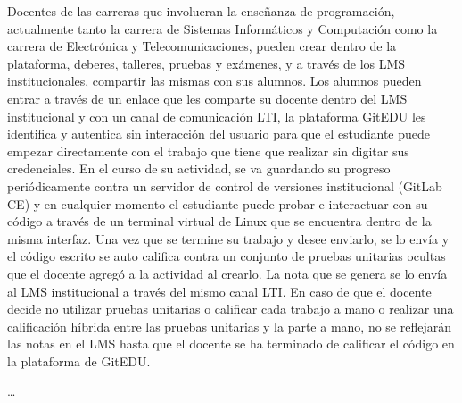 Docentes de las carreras que involucran la enseñanza de programación, actualmente tanto la carrera de Sistemas Informáticos y Computación como la carrera de Electrónica y Telecomunicaciones, pueden crear dentro de la plataforma, deberes, talleres, pruebas y exámenes, y a través de los LMS institucionales, compartir las mismas con sus alumnos. Los alumnos pueden entrar a través de un enlace que les comparte su docente dentro del LMS institucional y con un canal de comunicación LTI, la plataforma GitEDU les identifica y autentica sin interacción del usuario para que el estudiante puede empezar directamente con el trabajo que tiene que realizar sin digitar sus credenciales. En el curso de su actividad, se va guardando su progreso periódicamente contra un servidor de control de versiones institucional (GitLab CE) y en cualquier momento el estudiante puede probar e interactuar con su código a través de un terminal virtual de Linux que se encuentra dentro de la misma interfaz. Una vez que se termine su trabajo y desee enviarlo, se lo envía y el código escrito se auto califica contra un conjunto de pruebas unitarias ocultas que el docente agregó a la actividad al crearlo. La nota que se genera se lo envía al LMS institucional a través del mismo canal LTI. En caso de que el docente decide no utilizar pruebas unitarias o calificar cada trabajo a mano o realizar una calificación híbrida entre las pruebas unitarias y la parte a mano, no se reflejarán las notas en el LMS hasta que el docente se ha terminado de calificar el código en la plataforma de GitEDU.


\ldots
